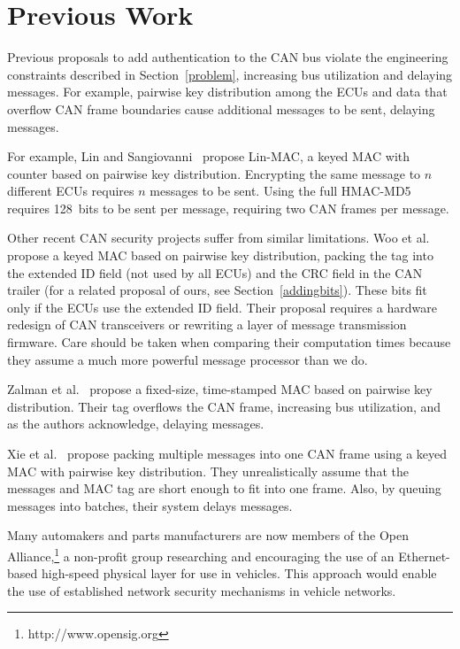 \section{Previous Work}
\label{previous}

Previous proposals to add authentication to the CAN bus violate the engineering constraints described
in Section~\ref{problem}, increasing bus utilization and delaying messages.  For example, pairwise
key distribution among the ECUs and data that overflow CAN frame boundaries cause additional messages to be sent,
delaying messages.

For example, Lin and Sangiovanni~\cite{Lin-MAC} propose Lin-MAC, a keyed MAC with counter based on
pairwise key distribution.  Encrypting the same message to $n$ different ECUs requires $n$
messages to be sent.   Using the full HMAC-MD5 requires 128~bits to be sent per message, requiring two CAN frames per message.

Other recent CAN security projects suffer from similar limitations. 
Woo et al.~\cite{Woo-14} propose a keyed MAC based on pairwise key distribution,
packing the tag into the extended ID field (not used by all ECUs) and the CRC field in the CAN trailer
(for a related proposal of ours, see Section~\ref{addingbits}). 
These bits fit only if the ECUs use the extended ID field. 
Their proposal requires a hardware redesign of CAN transceivers or rewriting a layer of message transmission firmware.
Care should be taken when comparing their computation times because
they assume a much more powerful message processor than we do. 

Zalman et al.~\cite{Zalman-14} propose a fixed-size, time-stamped MAC based on pairwise key distribution.
Their tag overflows the CAN frame, increasing bus utilization, and as the authors acknowledge,
delaying messages.

Xie et al.~\cite{Xie-15} propose packing multiple messages into one CAN frame using a keyed MAC with 
pairwise key distribution.   They unrealistically assume that the messages and MAC tag are short
enough to fit into one frame.  Also, by queuing messages into batches, their system delays messages.


Many automakers and parts manufacturers are now members of the 
Open Alliance,\footnote{http://www.opensig.org}
a non-profit group researching and encouraging the use of an Ethernet-based high-speed physical layer 
for use in vehicles.  This approach would enable the use of 
established network security mechanisms in vehicle networks.

